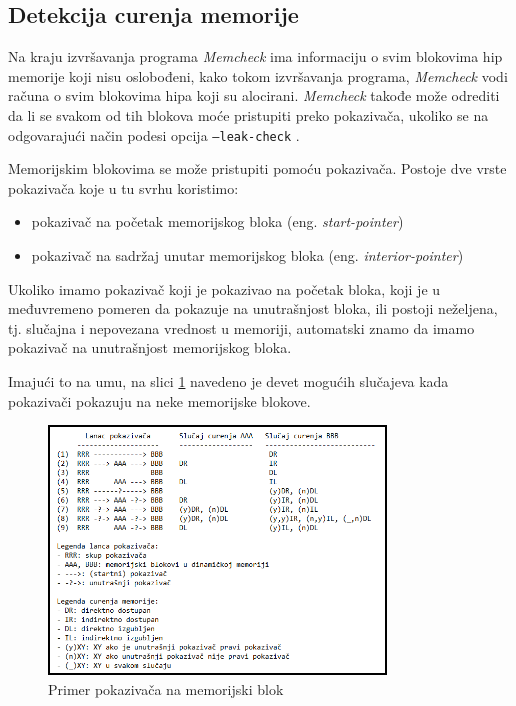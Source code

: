\documentclass[12pt,oneside]{memoir}
\theoremstyle{plain}
\theoremstyle{definition}
\begin{document}
\subsection{Detekcija curenja memorije}
Na kraju izvršavanja programa \textit{Memcheck} ima informaciju o svim blokovima hip memorije koji nisu oslobođeni, kako tokom izvršavanja programa, \textit{Memcheck} vodi računa o svim blokovima hipa koji su alocirani. \textit{Memcheck} takođe može odrediti da li se svakom od tih blokova moće pristupiti preko pokazivača, ukoliko se na odgovarajući način podesi opcija \texttt{--leak-check} \cite{Memcheck}.

Memorijskim blokovima se može pristupiti pomoću pokazivača. Postoje dve vrste pokazivača koje u tu svrhu koristimo:
\begin{itemize}
\item pokazivač na početak memorijskog bloka (eng. \textit{start-pointer})
\item pokazivač na sadržaj unutar memorijskog bloka (eng. \textit{interior-pointer})
\end{itemize}

Ukoliko imamo pokazivač koji je pokazivao na početak bloka, koji je u međuvremeno pomeren da pokazuje na unutrašnjost bloka, ili postoji neželjena, tj. slučajna i nepovezana vrednost u memoriji, automatski znamo da imamo pokazivač na unutrašnjost memorijskog bloka. 

Imajući to na umu, na slici \ref{fig:slika2.12} navedeno je devet mogućih slučajeva kada pokazivači pokazuju na neke memorijske blokove.
\begin{figure}[!ht]
  \centering
  \includegraphics[width=0.8\textwidth]{memoryLeacking2.png}
  \caption{Primer pokazivača na memorijski blok}
  \label{fig:slika2.12}
\end{figure}
\end{document}

